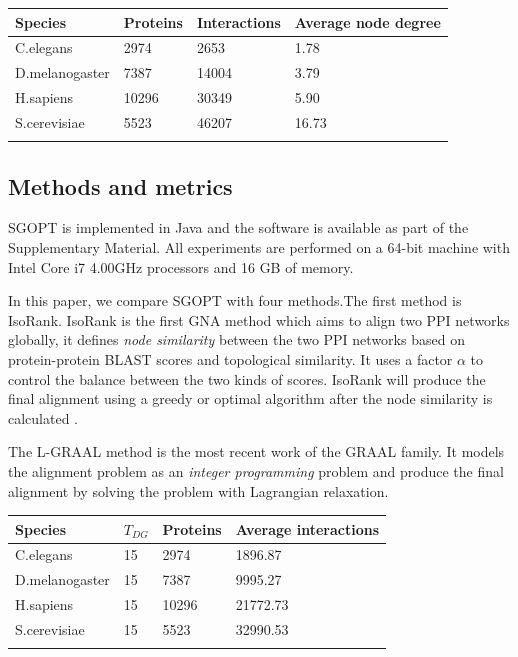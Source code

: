 \documentclass{bioinfo}
\theoremstyle{definition}
\begin{document}
\begin{table}[!h]
{
\begin{tabular}{@{}llll@{}}
\toprule 
Species & Proteins & Interactions & Average node degree\\
\midrule
C.elegans & 2974 & 2653 & 1.78\\
D.melanogaster & 7387 & 14004 & 3.79\\
H.sapiens & 10296 & 30349 & 5.90\\
S.cerevisiae & 5523 & 46207 & 16.73\\
\botrule
\end{tabular}
}{}
\end{table}


\subsection{Methods and metrics}
SGOPT is implemented in Java and the software is available as part of the Supplementary Material. All experiments are performed on a 64-bit machine with Intel Core i7 4.00GHz processors and 16 GB of memory. 

In this paper, we compare SGOPT with four methods.The first method is IsoRank\citep{singh2008global}. IsoRank is the first GNA method which aims to align two PPI networks globally, it defines \textit{node similarity} between the two PPI networks based on protein-protein BLAST scores\citep{altschul1990basic} and topological similarity. It uses a factor $\alpha$ to control the balance between the two kinds of scores. IsoRank will produce the final alignment using a greedy or optimal algorithm after the node similarity is calculated .

The L-GRAAL\citep{malod2015graal} method is the most recent work of the GRAAL family. It models the alignment problem as an \textit{integer programming} problem and produce the final alignment by solving the problem with Lagrangian relaxation.

\begin{table}[!h]
{
\begin{tabular}{@{}llll@{}}
\toprule 
Species & $T_{DG}$ & Proteins & Average interactions\\
\midrule
C.elegans & 15 & 2974 & 1896.87\\
D.melanogaster & 15 & 7387 & 9995.27\\
H.sapiens & 15 & 10296 & 21772.73\\
S.cerevisiae & 15 & 5523 & 32990.53\\
\botrule
\end{tabular}
}{}
\end{table}
\end{document}
